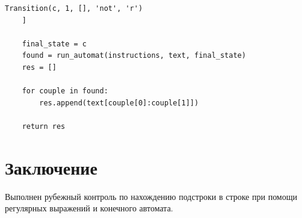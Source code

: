 \documentclass[a4paper, 14pt]{article}
\begin{document}
\begin{lstlisting}[label=some-code,caption=Автомат для поиска даты в текстовом формате]
        Transition(c, 1, [], 'not', 'r')
    ]

    final_state = c
    found = run_automat(instructions, text, final_state)
    res = []

    for couple in found:
        res.append(text[couple[0]:couple[1]])

    return res
		\end{lstlisting}
        
    	\newpage
        \section*{Заключение}
        
        Выполнен рубежный контроль по нахождению подстроки в строке при помощи регулярных выражений и конечного автомата.
     
\end{document}
